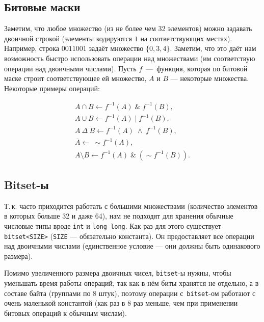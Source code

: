 



\subsection{Битовые маски}

Заметим, что любое множество (из не более чем 32 элементов) можно задавать двоичной строкой (элементы кодируются $1$ на соответствующих местах). Например, строка $0011001$ задаёт множество $\{0, 3, 4\}$. Заметим, что это даёт нам возможность быстро использовать операции над множествами (им соответствую операции над двоичными числами). Пусть $f$~---~функция, которая по битовой маске строит соответствующее ей множество, $A$ и $B$ --- некоторые множества. Некоторые примеры операций:

$$
    \begin{array}{l}
    A \cap B \leftarrow f^{-1}(A)\; \&\; f^{-1}(B),\\
    A \cup B \leftarrow f^{-1}(A)\; |\; f^{-1}(B),\\
    A\:\Delta\:B \leftarrow f^{-1}(A)\; \wedge\; f^{-1}(B),\\
    \overline{A} \leftarrow\ \sim f^{-1}(A),\\
    A \setminus B \leftarrow f^{-1}(A)\; \&\; (\sim f^{-1}(B)).
\end{array}$$

\subsection{Bitset-ы}

Т.\,к. часто приходится работать с большими множествами (количество элементов в которых больше 32 и даже 64), нам не подходят для хранения обычные числовые типы вроде \texttt{int} и \texttt{long long}. Как раз для этого существует \texttt{bitset<SIZE>} (\texttt{SIZE} --- обязательно константа). Он предоставляет все операции над двоичными числами (единственное условие --- они должны быть одинакового размера).

Помимо увеличенного размера двоичных чисел, \texttt{bitset}-ы нужны, чтобы уменьшать время работы операций, так как в нём биты хранятся не отдельно, а в составе байта (группами по 8 штук), поэтому операции с~\texttt{bitset}-ом работают с очень маленькой константой (как раз в 8 раз меньше, чем при применении битовых операций к обычным числам).

